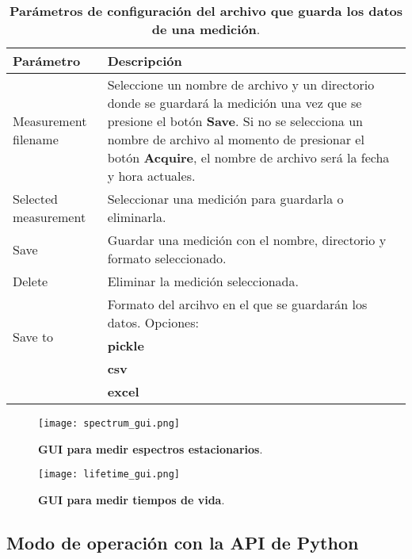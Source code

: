 \begin{table}[htbp]
    \centering
    \begin{tabularx}{\textwidth}{|l|X|}
        \hline
        \textbf{Parámetro} & \textbf{Descripción} \\
        \hline
        Measurement filename & Seleccione un nombre de archivo y un directorio donde se guardará la medición una vez que se presione el botón \textbf{Save}. Si no se selecciona un nombre de archivo al momento de presionar el botón \textbf{Acquire}, el nombre de archivo será la fecha y hora actuales. \\
        \hline
        Selected measurement & Seleccionar una medición para guardarla o eliminarla. \\
        \hline
        Save & Guardar una medición con el nombre, directorio y formato seleccionado. \\
        \hline
        Delete & Eliminar la medición seleccionada. \\
        \hline
        \multirow{3}{3cm}{Save to} & Formato del arcihvo en el que se guardarán los datos. Opciones: \\
        \cline{2-2}
        & \textbf{pickle} \\
        \cline{2-2}
        & \textbf{csv} \\
        \cline{2-2}
        & \textbf{excel} \\
        \hline
    \end{tabularx}
    \caption{\textbf{Parámetros de configuración del archivo que guarda los datos de una medición}.}
    \label{tab:file_parameters}
\end{table}

\begin{figure}
    \centering
    \texttt{[image: spectrum\_gui.png]}
    \caption{\textbf{GUI para medir espectros estacionarios}.}
    \label{fig:spectrum_gui}
\end{figure}

\begin{figure}
    \centering
    \texttt{[image: lifetime\_gui.png]}
    \caption{\textbf{GUI para medir tiempos de vida}.}
    \label{fig:lifetime_gui}
\end{figure}

\subsection{Modo de operación con la API de Python}

